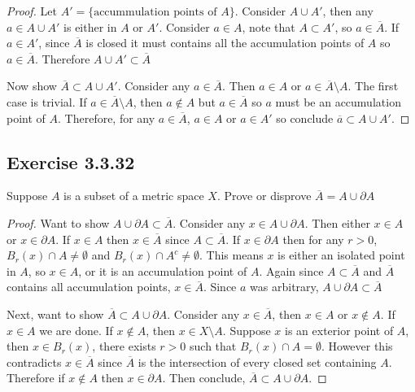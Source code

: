 \documentclass{tufte-book}
\theoremstyle{mytheoremstyle}
\theoremstyle{mylemstyle}
\theoremstyle{mydefstyle}
\begin{document}
\begin{proof}
Let $A'=\{ \text{accummulation points of }A\}$. Consider $A \cup A'$, then any $a \in A \cup A'$ is either in $A$ or $A'$.  Consider $a \in A$, note that $A \subset A'$, so $a \in \overline{A}$.  If $a \in A'$, since $\overline{A}$ is closed it must contains all the accumulation points of $A$ so $a \in \overline{A}$.  Therefore $A \cup A' \subset \overline{A}$

Now show $\overline{A} \subset A \cup A'$.  Consider any $a \in \overline{A}$.  Then $a \in A$ or $a \in \overline{A}\setminus A$. The first case is trivial. If $a \in \overline{A}\setminus A$, then $a \notin A$ but $a \in \overline{A}$ so $a$ must be an accumulation point of $A$.  Therefore, for any $a \in \overline{A}$, $a \in A$ or $a \in A'$ so conclude $\overline{a} \subset A \cup A'$.
\end{proof}

\subsection{Exercise 3.3.32}
Suppose $A$ is a subset of a metric space $X$.  Prove or disprove $\overline{A} = A\cup \partial A$

\begin{proof}
Want to show $A\cup \partial A \subset \overline{A}$. Consider any $x \in A \cup \partial A$. Then either $x \in A$ or $x \in \partial A$.  If $x \in A$ then $x \in \overline{A}$ since $A \subset \overline{A}$.  If $x \in \partial A$ then for any $r>0$, $B_r(x) \cap A \neq \emptyset$ and $B_r(x) \cap A^c \neq \emptyset$.  This means $x$ is either an isolated point in $A$, so $x \in A$, or it is an accumulation point of $A$.  Again since $A \subset \overline{A}$ and $\overline{A}$ contains all accumulation points, $x \in \overline{A}$.  Since $a$ was arbitrary, $A\cup \partial A \subset \overline{A}$

Next, want to show $\overline{A} \subset A\cup \partial A$.  Consider any $x \in \overline{A}$, then $x \in A$ or $x \notin A$. If $x \in A$ we are done.  If $x \notin A$, then $x \in X \setminus A$.  Suppose $x$ is an exterior point of $A$, then $x \in B_r(x)$, there exists $r >0$ such that $B_r(x) \cap A = \emptyset$. However this contradicts $x \in \overline{A}$ since $\overline{A}$ is the intersection of every closed set containing $A$.  Therefore if $x \notin A$ then $x \in \partial A$.  Then conclude, $\overline{A} \subset A\cup \partial A$.
\end{proof}
\end{document}
